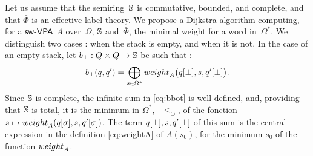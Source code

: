 \label{sec:best}\label{sec:search}
\noindent
Let us assume that the semiring~$\mathbb{S}$ is
commutative, bounded, and complete,  
and that $\bar\Phi$ is an effective label theory.
% 
%
We propose a Dijkstra algorithm computing, for a $\textsf{sw-VPA}$ $A$
over~$\Omega$, $\mathbb{S}$ and~$\bar\Phi$, 
the minimal weight %
for a word in~$\Omega^*$.
%
\noindent
We distinguish two cases : when the stack is empty, and when it is not. 
%
In the case of an empty stack, let $b_\bot : Q \times Q \to \mathbb{S}$ be such that : %
%
\begin{equation}\label{eq:bbot}
  b_\bot(q, q') = \bigoplus_{s\in \Omega^*} 
  \textstyle
  \weight_A\bigl(\config{q}{\bot}, s, \config{q'}{\bot}\bigr).
\end{equation}
%
Since $\mathbb{S}$ is complete, the infinite sum in \eqref{eq:bbot} is well defined,
and, providing that $\mathbb{S}$ is total, it is the minimum in $\Omega^*$,
\wrt~$\leq_\oplus$, %
of the fonction 
$s \mapsto \weight_A(\config{q}{\sigma}, s, \config{q'}{\sigma})$.
%
The term $q[{\bot}], s, q'[{\bot}]$ 
of this sum is the central expression in 
the definition \eqref{eq:weightA} of $A(s_0)$, for the minimum $s_0$
of the function $\weight_A$.

